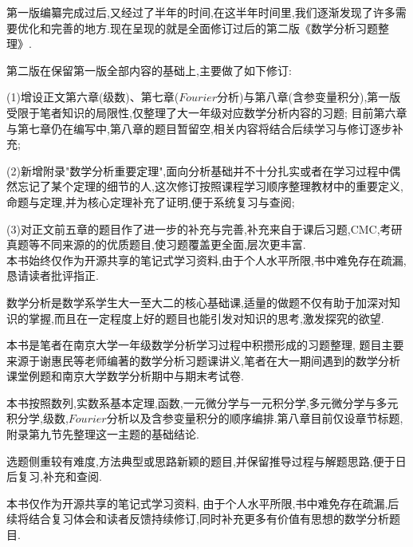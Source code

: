 \documentclass[a4paper,12pt,fleqn,openany,twoside,fontset=windows]{ctexbook}
\begin{document}
\maketitle
\frontmatter

\begin{booknotebody}
第一版编纂完成过后,又经过了半年的时间,在这半年时间里,我们逐渐发现了许多需要优化和完善的地方.现在呈现的就是全面修订过后的第二版《数学分析习题整理》.

第二版在保留第一版全部内容的基础上,主要做了如下修订: 

(1)增设正文第六章(级数)、第七章($Fourier$分析)与第八章(含参变量积分),第一版受限于笔者知识的局限性,仅整理了大一年级对应数学分析内容的习题;
目前第六章与第七章仍在编写中,第八章的题目暂留空,相关内容将结合后续学习与修订逐步补充;

(2)新增附录"数学分析重要定理",面向分析基础并不十分扎实或者在学习过程中偶然忘记了某个定理的细节的人,这次修订按照课程学习顺序整理教材中的重要定义,命题与定理,并为核心定理补充了证明,便于系统复习与查阅; 

(3)对正文前五章的题目作了进一步的补充与完善,补充来自于课后习题,CMC,考研真题等不同来源的的优质题目,使习题覆盖更全面,层次更丰富. \\

本书始终仅作为开源共享的笔记式学习资料,由于个人水平所限,书中难免存在疏漏,恳请读者批评指正.

\par\vspace{2.5em}
\end{booknotebody}
\clearpage

\begin{booknotebody}
数学分析是数学系学生大一至大二的核心基础课,适量的做题不仅有助于加深对知识的掌握,而且在一定程度上好的题目也能引发对知识的思考,激发探究的欲望.

本书是笔者在南京大学一年级数学分析学习过程中积攒形成的习题整理,
题目主要来源于谢惠民等老师编著的数学分析习题课讲义,笔者在大一期间遇到的数学分析课堂例题和南京大学数学分析期中与期末考试卷. 

本书按照数列,实数系基本定理,函数,一元微分学与一元积分学,多元微分学与多元积分学,级数,$Fourier$分析以及含参变量积分的顺序编排.第八章目前仅设章节标题,附录第九节先整理这一主题的基础结论.

选题侧重较有难度,方法典型或思路新颖的题目,并保留推导过程与解题思路,便于日后复习,补充和查阅. 

本书仅作为开源共享的笔记式学习资料,
由于个人水平所限,书中难免存在疏漏,后续将结合复习体会和读者反馈持续修订,同时补充更多有价值有思想的数学分析题目.

\par\vspace{2.5em}
\end{booknotebody}
\clearpage
\end{document}
